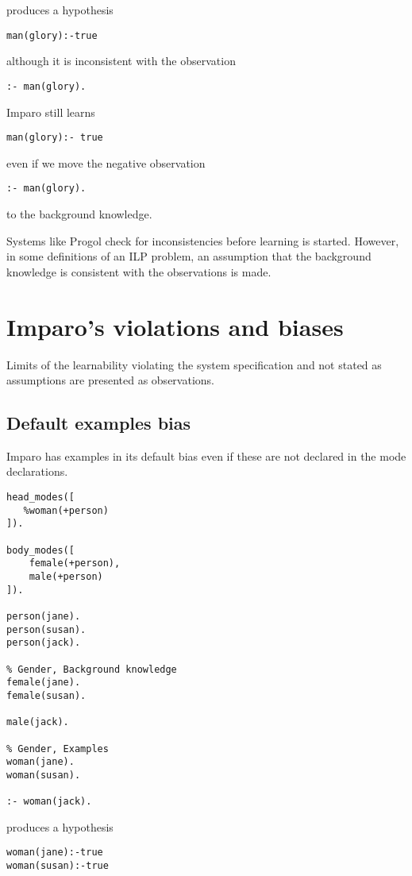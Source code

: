 produces a hypothesis
\begin{lstlisting}
man(glory):-true
\end{lstlisting}
although it is inconsistent with the observation
\begin{lstlisting}
:- man(glory).
\end{lstlisting}

Imparo still learns
\begin{lstlisting}
man(glory):- true
\end{lstlisting}
even if we move the negative observation
\begin{lstlisting}
:- man(glory).
\end{lstlisting}
to the background knowledge.

Systems like Progol check for inconsistencies before learning is started. However, in some definitions of an ILP problem, an assumption that the background knowledge is consistent with the observations is made.

\section{Imparo's violations and biases}
Limits of the learnability violating the system specification and not stated as assumptions are presented as observations.

\subsection{Default examples bias}
Imparo has examples in its default bias even if these are not declared in the mode declarations.

\begin{lstlisting}
head_modes([
   %woman(+person)
]).

body_modes([
    female(+person),
    male(+person)
]).

person(jane).
person(susan).
person(jack).

% Gender, Background knowledge
female(jane).
female(susan).

male(jack).

% Gender, Examples
woman(jane).
woman(susan).

:- woman(jack).
\end{lstlisting}

produces a hypothesis 
\begin{lstlisting}
woman(jane):-true
woman(susan):-true
\end{lstlisting}

